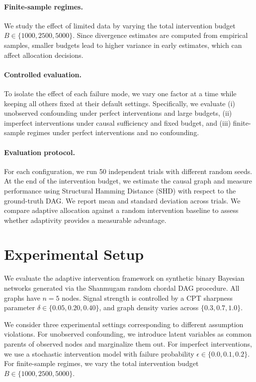 \documentclass{article}
\begin{document}
\paragraph{Finite-sample regimes.}
We study the effect of limited data by varying the total intervention budget $B \in \{1000, 2500, 5000\}$. Since divergence estimates are computed from empirical samples, smaller budgets lead to higher variance in early estimates, which can affect allocation decisions.

\paragraph{Controlled evaluation.}
To isolate the effect of each failure mode, we vary one factor at a time while keeping all others fixed at their default settings. Specifically, we evaluate (i) unobserved confounding under perfect interventions and large budgets, (ii) imperfect interventions under causal sufficiency and fixed budget, and (iii) finite-sample regimes under perfect interventions and no confounding.

\paragraph{Evaluation protocol.}
For each configuration, we run 50 independent trials with different random seeds. At the end of the intervention budget, we estimate the causal graph and measure performance using Structural Hamming Distance (SHD) with respect to the ground-truth DAG. We report mean and standard deviation across trials. We compare adaptive allocation against a random intervention baseline to assess whether adaptivity provides a measurable advantage.


\section{Experimental Setup}
We evaluate the adaptive intervention framework on synthetic binary Bayesian networks generated via the Shanmugam random chordal DAG procedure. All graphs have $n=5$ nodes. Signal strength is controlled by a CPT sharpness parameter $\delta \in \{0.05, 0.20, 0.40\}$, and graph density varies across $\{0.3, 0.7, 1.0\}$.

We consider three experimental settings corresponding to different assumption violations. For unobserved confounding, we introduce latent variables as common parents of observed nodes and marginalize them out. For imperfect interventions, we use a stochastic intervention model with failure probability $\epsilon \in \{0.0, 0.1, 0.2\}$. For finite-sample regimes, we vary the total intervention budget $B \in \{1000, 2500, 5000\}$.
\end{document}
